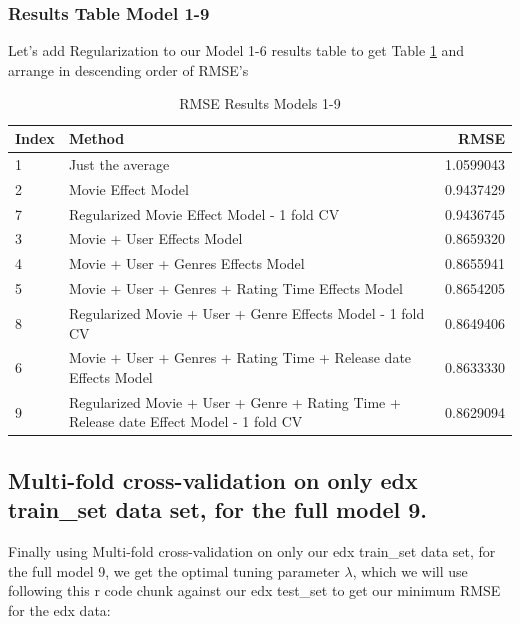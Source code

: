 \documentclass[
]{article}
\begin{document}
\hypertarget{results-table-model-1-9}{%
\subsubsection{Results Table Model 1-9}\label{results-table-model-1-9}}

Let's add Regularization to our Model 1-6 results table to get Table
\ref{tbl:rmse_results_model_1-9} and arrange in descending order of
RMSE's

\begin{table}[H]

\caption{\label{tab:m9_4}RMSE Results Models 1-9\label{tbl:rmse_results_model_1-9}}
\centering
\fontsize{7}{9}\selectfont
\begin{tabular}[t]{llr}
\toprule
Index & Method & RMSE\\
\midrule
1 & Just the average & 1.0599043\\
2 & Movie Effect Model & 0.9437429\\
7 & Regularized Movie Effect Model - 1 fold CV & 0.9436745\\
3 & Movie + User Effects Model & 0.8659320\\
4 & Movie + User + Genres Effects Model & 0.8655941\\
5 & Movie + User + Genres + Rating Time Effects Model & 0.8654205\\
8 & Regularized Movie + User + Genre Effects Model - 1 fold CV & 0.8649406\\
6 & Movie + User + Genres + Rating Time + Release date Effects Model & 0.8633330\\
9 & Regularized Movie + User + Genre + Rating Time + Release date Effect Model - 1 fold CV & 0.8629094\\
\bottomrule
\end{tabular}
\end{table}

\newpage

\hypertarget{multi-fold-cross-validation-on-only-edx-train_set-data-set-for-the-full-model-9.}{%
\subsection{Multi-fold cross-validation on only edx train\_set data set,
for the full model
9.}\label{multi-fold-cross-validation-on-only-edx-train_set-data-set-for-the-full-model-9.}}

Finally using Multi-fold cross-validation on only our edx train\_set
data set, for the full model 9, we get the optimal tuning parameter
\(\lambda\), which we will use following this r code chunk against our
edx test\_set to get our minimum RMSE for the edx data:
\end{document}
